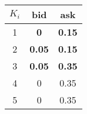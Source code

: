 	\begin{tabular}{c|c|c}						
			$K_i$    & bid        & ask      \\
			\hline
			1     &    \textbf{0}       &    \textbf{0.15}  \\
			2     &    \textbf{0.05}    &    \textbf{0.15}  \\
			3     &    \textbf{0.05}    &    \textbf{0.35}  \\
			4     &    0       &    0.35  \\
			5     &    0       &    0.35   
	\end{tabular}
